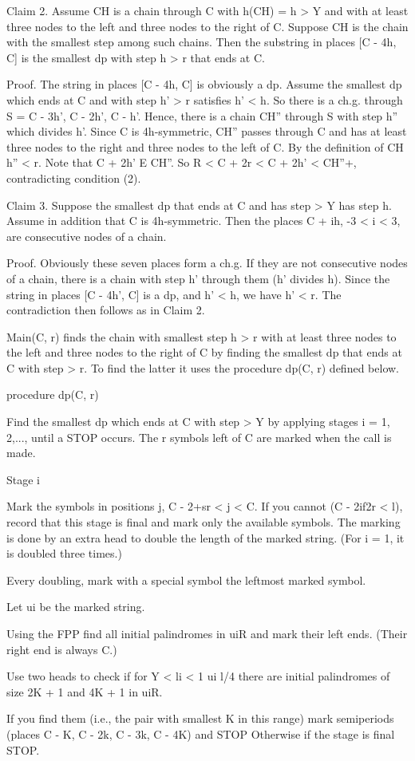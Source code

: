 \documentclass[11pt,a4paper]{report}
\begin{document}
Claim 2. Assume CH is a chain through C with h(CH) = h > Y and with at least
three nodes to the left and three nodes to the right of C. Suppose CH is the chain with 
the smallest step among such chains. Then the substring in places [C - 4h, C] is the smallest
dp with step h > r that ends at C.

Proof. The string in places [C - 4h, C] is obviously a dp. Assume the smallest dp
which ends at C and with step h’ > r satisfies h’ < h. So there is a ch.g. through S =
{C - 3h’, C - 2h’, C - h’}. Hence, there is a chain CH” through S with step h” which
divides h’. Since C is 4h-symmetric, CH” passes through C and has at least three nodes
to the right and three nodes to the left of C. By the definition of CH h” < r. Note that
C + 2h’ E CH”. So R < C + 2r < C + 2h’ < CH”+, contradicting condition (2). 

Claim 3. Suppose the smallest dp that ends at C and has step > Y has step h. Assume
in addition that C is 4h-symmetric. Then the places C + ih, -3 < i < 3, are consecutive
nodes of a chain.

Proof. Obviously these seven places form a ch.g. If they are not consecutive nodes
of a chain, there is a chain with step h’ through them (h’ divides h). Since the string in
places [C - 4h’, C] is a dp, and h’ < h, we have h’ < r. The contradiction then follows
as in Claim 2. 

Main(C, r) finds the chain with smallest step h > r with at least three nodes to the left
and three nodes to the right of C by finding the smallest dp that ends at C with step > r.
To find the latter it uses the procedure dp(C, r) defined below.

procedure dp(C, r)
\begin{myindentpar}{3cm}
Find the smallest dp which ends at C with step > Y by
applying stages i = 1, 2,..., until a STOP occurs. The r symbols
left of C are marked when the call is made.

Stage i

Mark the symbols in positions j, C - 2+sr < j < C. If you cannot
(C - 2if2r < l), record that this stage is final and mark only the
available symbols. The marking is done by an extra head to double
the length of the marked string. (For i = 1, it is doubled three times.)

Every doubling, mark with a special symbol the leftmost marked
symbol.

Let ui be the marked string.

Using the FPP find all initial palindromes in uiR and mark their
left ends. (Their right end is always C.)

Use two heads to check if for Y < li < 1 ui l/4 there are initial
palindromes of size 2K + 1 and 4K + 1 in uiR.

If you find them (i.e., the pair with smallest K in this range)
mark semiperiods (places C - K, C - 2k, C - 3k, C - 4K) and STOP
Otherwise if the stage is final STOP.

\end{myindentpar}
\end{document}
